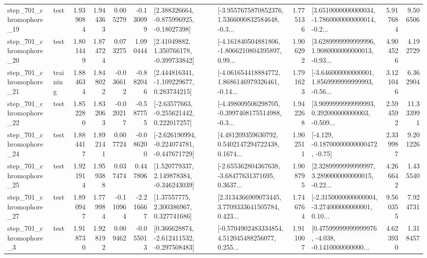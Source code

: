 \begin{tabular}{llrrrrllrlrr}
  step\_701\_chromophore\_19 &      test &      1.939084 &    1.944363 &      0.005279 & -0.130099 &    [2.388326664, -0.875996925, -0.18027398] &  [-3.9557675870852376, 1.5366000832584648, -0.3... &       1.775136 &  [3.6510000000000034, -1.7860000000000014, -0.2... &            5.917684 &          9.506506 \\
  step\_701\_chromophore\_20 &      test &      1.801449 &    1.874724 &      0.073275 &  1.090444 &     [2.41049882, 1.350766178, -0.399733842] &  [-4.161840504881806, -1.8066210804395897, 0.99... &       1.906292 &  [3.6289999999999996, 1.9080000000000013, -0.93... &            4.904526 &          4.192729 \\
  step\_701\_chromophore\_21 &  training &      1.884634 &    1.848022 &     -0.036612 & -0.882046 &    [2.444816341, -1.109229677, 0.283734215] &  [-4.061654418884772, 1.8686146979326461, -0.14... &       1.791623 &  [-3.646000000000001, 1.8569999999999993, -0.56... &            3.121046 &          6.362904 \\
  step\_701\_chromophore\_22 &      test &      1.852280 &    1.832063 &     -0.020217 & -0.587755 &    [-2.63577663, -0.255621442, 0.222017257] &  [-4.498009506298705, -0.3997408175514988, -0.3... &       1.942268 &  [3.9099999999999993, 0.392000000000003, -0.509... &            2.594592 &         11.333991 \\
  step\_701\_chromophore\_24 &      test &      1.884417 &    1.892141 &      0.007724 & -0.086200 &  [-2.626190994, -0.224074781, -0.447671729] &  [4.481209359630792, 0.5402147294722438, 0.1674... &       1.902511 &              [-4.129, -0.18700000000000472, -0.75] &            2.339987 &          9.201226 \\
  step\_701\_chromophore\_25 &      test &      1.921914 &    1.959388 &      0.037474 &  0.447806 &    [1.520779337, 2.149878384, -0.346243039] &  [-2.655362804367638, -3.68477631371695, 0.3637... &       1.908795 &  [2.3289999999999997, 3.2890000000000015, -0.22... &            4.266642 &          1.435540 \\
  step\_701\_chromophore\_27 &      test &      1.890947 &    1.779984 &     -0.110964 & -2.216667 &      [1.37557775, 2.300386967, 0.327741686] &  [2.3134366909073445, 3.7709333641505784, 0.423... &       1.746764 &  [-2.3150000000000004, -3.274000000000001, 0.10... &            9.560355 &          7.924731 \\
   step\_701\_chromophore\_3 &      test &      1.918730 &    1.928192 &      0.009462 & -0.055013 &   [0.366628874, -2.612411532, -0.297508483] &  [-0.5704902483334854, 4.512045488256077, 0.255... &       1.911007 &  [0.47599999999999976, -4.038, -0.1410000000000... &            4.623930 &          1.318457 \\

\end{tabular}
